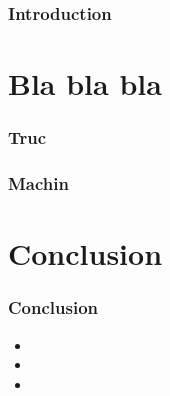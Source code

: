 \documentclass{beamer}
\begin{document}
\begin{frame}
  \frametitle{Introduction}
\end{frame}
%
%
\section{Bla bla bla}
%
%
\begin{frame}
  \frametitle{Truc}
\end{frame}
%
%
\begin{frame}
  \frametitle{Machin}
\end{frame}
%
%
\section{Conclusion}
%
%
\begin{frame}
  \frametitle{Conclusion}
  \begin{itemize}
    \item
    \item
    \item
  \end{itemize}
\end{frame}
%
%
\end{document}
